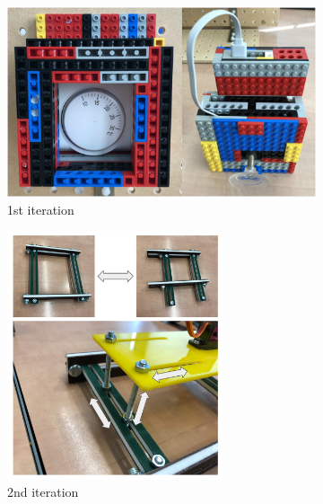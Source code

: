 \documentclass[onecolumn]{IEEEtran}
\begin{document}
        \begin{figure}
            \begin{subfigure}{.3\textwidth}
                \centering
                \includegraphics[width=1\textwidth]{images/Thermo1.jpg}
                \caption{1st iteration}
            \end{subfigure}\hfill
            \begin{subfigure}{.3\textwidth}
                \centering
                \includegraphics[width=0.7\textwidth]{images/Thermo2.png}
                \caption{2nd iteration}
            \end{subfigure}\hfill
            \begin{subfigure}{.3\textwidth}
                \centering

\end{subfigure}
\end{figure}
\end{document}

